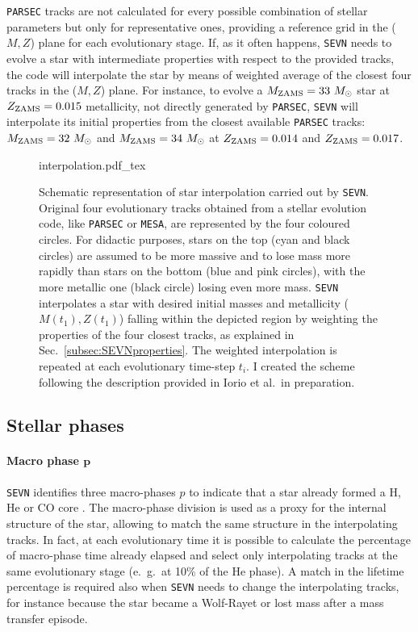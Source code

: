 \documentclass[a4paper,titlepage]{book}     	%
\newcommand{\sun}{\ensuremath{_\odot}}
\newcommand{\mzams}{M_\textup{ZAMS}}
\newcommand{\zzams}{Z_\textup{ZAMS}}
\newcommand{\msun}{\ensuremath{M\sun}}
\begin{document}
\texttt{PARSEC} tracks are not calculated for every possible combination of stellar parameters but only for representative ones, providing a reference grid in the ($M,Z$) plane for each evolutionary stage. If, as it often happens, \texttt{SEVN} needs to evolve a star with intermediate properties with respect to the provided tracks, the code will interpolate the star by means of weighted average of the closest four tracks in the ($M,Z$) plane. For instance, to evolve a $\mzams = 33~\msun$ star at $\zzams=0.015$ metallicity, not directly generated by \texttt{PARSEC}, \texttt{SEVN} will interpolate its initial properties from the closest available \texttt{PARSEC} tracks: $\mzams = 32~\msun$ and $\mzams = 34~\msun$ at $\zzams = 0.014$ and $\zzams = 0.017$.


\begin{figure}
	\centering
	\def\svgwidth{0.5\textwidth}
	{interpolation.pdf_tex} 
	\caption{Schematic representation of star interpolation carried out by \texttt{SEVN}. Original four evolutionary tracks obtained from a stellar evolution code, like \texttt{PARSEC} or \texttt{MESA}, are represented by the four coloured circles. For didactic purposes, stars on the top (cyan and black circles) are assumed to be more massive and to lose mass more rapidly than stars on the bottom (blue and pink circles), with the more metallic one (black circle) losing even more mass. \texttt{SEVN} interpolates a star with desired initial masses and metallicity ($M(t_1),Z(t_1)$) falling within the depicted region by weighting the properties of the four closest tracks, as explained in Sec.\ \ref{subsec:SEVNproperties}. The weighted interpolation is repeated at each evolutionary time-step $t_i$. I created the scheme following the description provided in Iorio et al.\ in preparation.}\label{fig:SEVNinterpolation}
\end{figure}






\subsection{Stellar phases}\label{subsec:stellarphasesSEVN}
\paragraph{Macro phase $\boldsymbol{p}$} \texttt{SEVN} identifies three macro-phases $p$ to indicate that a star already formed a H, He or CO core \cite{spera2019_mergingBBH}. The macro-phase division is used as a proxy for the internal structure of the star, allowing to match the same structure in the interpolating tracks. In fact, at each evolutionary time it is possible to calculate the percentage of macro-phase time already elapsed and select only interpolating tracks at the same evolutionary stage (e.\ g.\ at 10\% of the He phase). A match in the lifetime percentage is required also when \texttt{SEVN} needs to change the interpolating tracks, for instance because the star became a Wolf-Rayet or lost mass after a mass transfer episode. 
\end{document}

